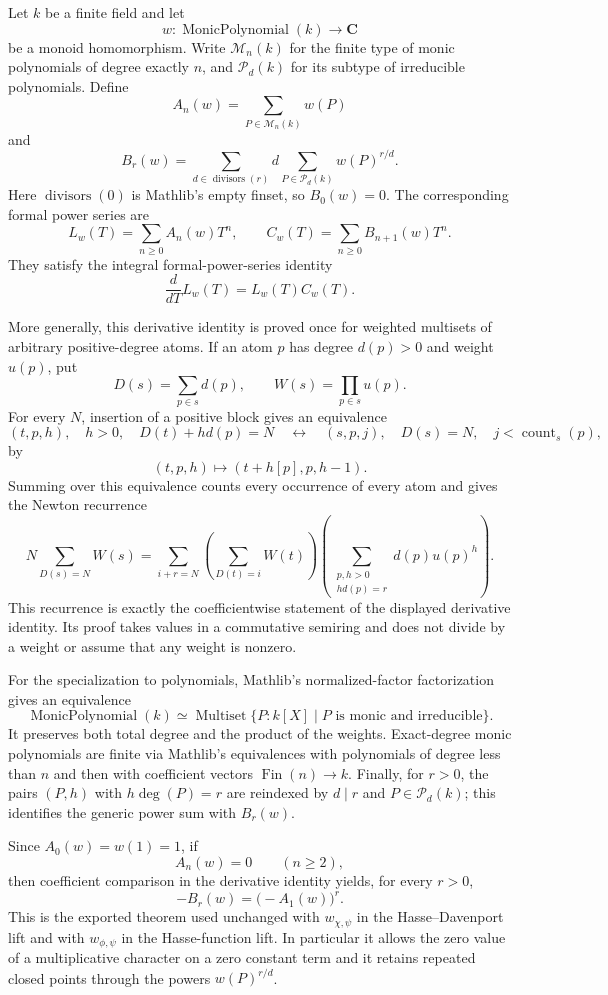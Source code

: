 \begin{theorem}\label{mod:finitefield-eulerproduct}
Let $k$ be a finite field and let
\[
 w:\operatorname{MonicPolynomial}(k)\longrightarrow \mathbf C
\]
be a monoid homomorphism.  Write $\mathcal M_n(k)$ for the finite type of
monic polynomials of degree exactly $n$, and $\mathcal P_d(k)$ for its
subtype of irreducible polynomials.  Define
\[
 A_n(w)=\sum_{P\in\mathcal M_n(k)}w(P)
\]
and
\[
 B_r(w)=
 \sum_{d\in\operatorname{divisors}(r)}
 d\sum_{P\in\mathcal P_d(k)}w(P)^{r/d}.
\]
Here $\operatorname{divisors}(0)$ is Mathlib's empty finset, so $B_0(w)=0$.
The corresponding formal power series are
\[
 L_w(T)=\sum_{n\geq 0}A_n(w)T^n,
 \qquad
 C_w(T)=\sum_{n\geq 0}B_{n+1}(w)T^n.
\]
They satisfy the integral formal-power-series identity
\[
 \frac{d}{dT}L_w(T)=L_w(T)C_w(T).
\]

More generally, this derivative identity is proved once for weighted
multisets of arbitrary positive-degree atoms.  If an atom $p$ has degree
$d(p)>0$ and weight $u(p)$, put
\[
 D(s)=\sum_{p\in s}d(p),\qquad W(s)=\prod_{p\in s}u(p).
\]
For every $N$, insertion of a positive block gives an equivalence
\[
 (t,p,h),\quad h>0,\quad D(t)+h d(p)=N
 \quad\longleftrightarrow\quad
 (s,p,j),\quad D(s)=N,\quad j<\operatorname{count}_s(p),
\]
by
\[
 (t,p,h)\longmapsto(t+h[p],p,h-1).
\]
Summing over this equivalence counts every occurrence of every atom and
gives the Newton recurrence
\[
 N\sum_{D(s)=N}W(s)
 =\sum_{i+r=N}
   \left(\sum_{D(t)=i}W(t)\right)
   \left(\sum_{\substack{p,h>0\\h d(p)=r}}
      d(p)u(p)^h\right).
\]
This recurrence is exactly the coefficientwise statement of the displayed
derivative identity.  Its proof takes values in a commutative semiring and
does not divide by a weight or assume that any weight is nonzero.

For the specialization to polynomials, Mathlib's normalized-factor
factorization gives an equivalence
\[
 \operatorname{MonicPolynomial}(k)
 \simeq
 \operatorname{Multiset}\{P:k[X]\mid P\text{ is monic and irreducible}\}.
\]
It preserves both total degree and the product of the weights.  Exact-degree
monic polynomials are finite via Mathlib's equivalences with polynomials of
degree less than $n$ and then with coefficient vectors
$\operatorname{Fin}(n)\to k$.  Finally, for $r>0$, the pairs $(P,h)$ with
$h\deg(P)=r$ are reindexed by $d\mid r$ and
$P\in\mathcal P_d(k)$; this identifies the generic power sum with $B_r(w)$.

Since $A_0(w)=w(1)=1$, if
\[
 A_n(w)=0\qquad(n\geq2),
\]
then coefficient comparison in the derivative identity yields, for every
$r>0$,
\[
 \boxed{-B_r(w)=\bigl(-A_1(w)\bigr)^r.}
\]
This is the exported theorem used unchanged with
$w_{\chi,\psi}$ in the Hasse--Davenport lift and with
$w_{\phi,\psi}$ in the Hasse-function lift.  In particular it allows the
zero value of a multiplicative character on a zero constant term and it
retains repeated closed points through the powers $w(P)^{r/d}$.


\end{theorem}
